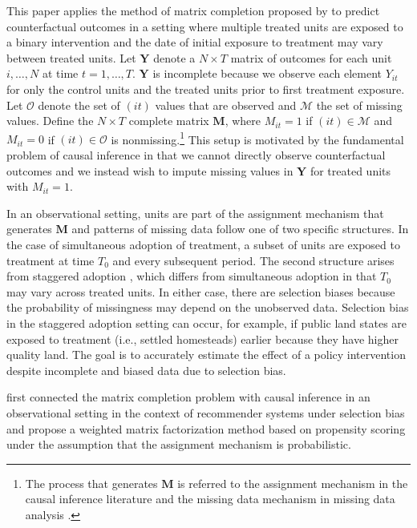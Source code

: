 \documentclass[12pt]{article}
\begin{document}
This paper applies the method of matrix completion proposed by \citet{athey2017matrix} to predict counterfactual outcomes in a setting where multiple treated units are exposed to a binary intervention and the date of initial exposure to treatment may vary between treated units. Let $\mathbf{Y}$ denote a $N \times T$ matrix of outcomes for each unit $i, \ldots, N$ at time $t = 1, \ldots, T$. $\mathbf{Y}$ is incomplete because we observe each element $Y_{it}$ for only the control units and the treated units prior to first treatment exposure. Let $\mathcal{O}$ denote the set of $(it)$ values that are observed and $\mathcal{M}$ the set of missing values. Define the $N \times T$ complete matrix $\mathbf{M}$, where $M_{it} =1 $ if $(it) \in \mathcal{M}$ and $M_{it} = 0$ if $(it) \in \mathcal{O}$ is nonmissing.\footnote{The process that generates $\mathbf{M}$ is referred to the assignment mechanism in the causal inference literature \citep{imbens2015causal} and the missing data mechanism in missing data analysis \citep[Chap.~1]{little2014}.} This setup is motivated by the fundamental problem of causal inference \citep{holland1986statistics} in that we cannot directly observe counterfactual outcomes and we instead wish to impute missing values in $\mathbf{Y}$ for treated units with $M_{it}=1$. 

In an observational setting, units are part of the assignment mechanism that generates $\mathbf{M}$ and patterns of missing data follow one of two specific structures. In the case of simultaneous adoption of treatment, a subset of units are exposed to treatment at time $T_0$ and every subsequent period. The second structure arises from staggered adoption \citep{athey2018design}, which differs from simultaneous adoption in that $T_0$ may vary across treated units. In either case, there are selection biases because the probability of missingness may depend on the unobserved data. Selection bias in the staggered adoption setting can occur, for example, if public land states are exposed to treatment (i.e., settled homesteads) earlier because they have higher quality land. The goal is to accurately estimate the effect of a policy intervention despite incomplete and biased data due to selection bias. 

\citet{schnabel2016recommendations} first connected the matrix completion problem with causal inference in an observational setting in the context of recommender systems under selection bias and propose a weighted matrix factorization method based on propensity scoring under the assumption that the assignment mechanism is probabilistic.
\end{document}
